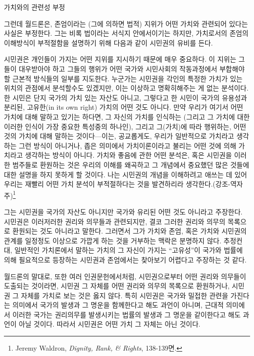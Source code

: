 가치와의 관련성 부정

그런데 월드론은, 존엄이라는 (그에 의하면 법적) 지위가 어떤 가치와 관련되어 있다는 사실은 부정한다. 그는 비록 법이라는 서식지 안에서이기는 하지만, 가치로서의 존엄의 이해방식이 부적절함을 설명하기 위해 다음과 같이 시민권의 유비를 든다.

시민권은 개인들이 가지는 어떤 지위를 지시하기 때문에 매우 중요하다. 이 지위는 그들이 대우받아야 하고 그들의 행위가 어떤 국가와 시민사회의 작동과정에서 부합해야 할 근본적 방식들의 일부를 지도한다. 누군가는 시민권을 각인의 특정한 가치가 있는 위치의 관점에서 분석할수도 있겠지만, 이는 이상하고 명확히해주는 게 없는 분석이다. 한 시민은 단지 국가의 가치 있는 자산도 아니고, 그렇다고 한 시민이 국가의 유용성과 분리된, 고유한(in its own right) 가치의 어떤 것도 아니다. 만약 우리가 여기서 어떤 가치에 대해 말하고 있기는 하다면, 그 자신의 가치를 인식하는 (그리고 그 가치에 대한 이러한 인식이 가장 중요한 특성중의 하나인), 그리고 그(가치)에 따라 행위하는, 어떤 것의 가치에 대해 말하는 것이다---이는, 공교롭게도, 우리가 일반적으로 가치라고 생각하는 그런 방식이 아니거나, 좁은 의미에서 가치이론이라고 불리는 어떤 것에 의해 가치라고 생각하는 방식이 아니다. 가치와 좋음에 관한 어떤 분석은, 혹은 시민권을 이러한 범주들로 환원하는 것은 우리의 이해를 왜곡하고 그 개념에서 중요했던 많은 것들에 대한 설명을 하지 못하게 할 것이다. 나는 시민권의 개념을 이해하려고 애쓰는 데 있어 우리는 재빨리 어떤 가치 분석이 부적절하다는 것을 발견하리라 생각한다.(강조-역자 주)\footnote{Jeremy Waldron, \emph{Dignity, Rank, \& Rights}, 138-139면.}

그는 시민권을 국가의 자산도 아니지만 국가와 유리된 어떤 것도 아니라고 주장한다. 시민권은 이러저러한 권리와 의무들과 관련되지만, 결코 그러한 권리와 의무의 목록으로 환원되는 것도 아니라고 말한다. 그러면서 그가 가치와 존엄, 혹은 가치와 시민권의 관계를 일정정도 이상으로 가깝게 하는 것을 거부하는 맥락은 분명하지 않다. 추정컨대, 일반적인 가치론에서 말하는 가치의 그 자신이 가지는 ``고유성''이 국가와 법률에 의해 필요적으로 등장하는 시민권과 존엄에서는 찾아보기 어렵다고 주장하는 것 같다.

월드론의 말대로, 또한 여러 인권문헌에서처럼, 시민권으로부터 어떤 권리와 의무들이 도출되는 것이라면, 시민권 그 자체를 어떤 권리와 의무의 목록으로 환원하거나, 시민권 그 자체를 가치로 보는 것은 옳지 않다. 특히 시민권은 국가와 밀접한 관련을 가진다는 의미에서 국가의 발생과 그 명운을 함께한다고 해도 과언이 아니며, 근대적 의미에서 이러한 국가는 권리의무를 발생시키는 법률의 발생과 그 명운을 같이한다고 해도 과언이 아닐 것이다. 따라서 시민권은 어떤 가치 그 자체는 아닌 것이다.

